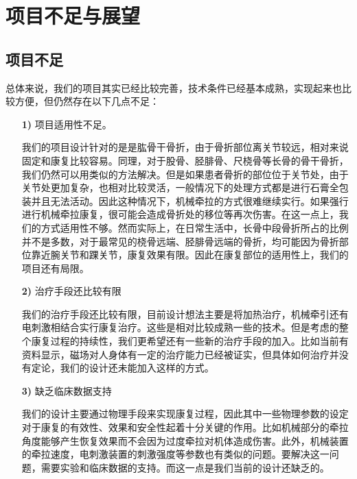 \documentclass[UTF8]{ctexart}
\begin{document}
\section{项目不足与展望}
    \subsection{项目不足}
        总体来说，我们的项目其实已经比较完善，技术条件已经基本成熟，实现起来也比较方便，但仍然存在以下几点不足：
        \begin{enumerate}
            \item [\textbf{1)}]项目适用性不足。
            
            我们的项目设计针对的是是肱骨干骨折，由于骨折部位离关节较远，相对来说固定和康复比较容易。同理，对于股骨、胫腓骨、尺桡骨等长骨的骨干骨折，我们仍然可以用类似的方法解决。但是如果患者骨折的部位位于关节处，由于关节处更加复杂，也相对比较灵活，一般情况下的处理方式都是进行石膏全包装并且无法活动。因此这种情况下，机械牵拉的方式很难继续实行。如果强行进行机械牵拉康复，很可能会造成骨折处的移位等再次伤害。在这一点上，我们的方式适用性不够。然而实际上，在日常生活中，长骨中段骨折所占的比例并不是多数，对于最常见的桡骨远端、胫腓骨远端的骨折，均可能因为骨折部位靠近腕关节和踝关节，康复效果有限。因此在康复部位的适用性上，我们的项目还有局限。

            \item [\textbf{2)}]治疗手段还比较有限
            
            我们的治疗手段还比较有限，目前设计想法主要是将加热治疗，机械牵引还有电刺激相结合实行康复治疗。这些是相对比较成熟一些的技术。但是考虑的整个康复过程的持续性，我们更希望还有一些新的治疗手段的加入。比如当前有资料显示，磁场对人身体有一定的治疗能力已经被证实，但具体如何治疗并没有定论，我们的设计还未能加入这样的方式。

            \item [\textbf{3)}]缺乏临床数据支持
            
            我们的设计主要通过物理手段来实现康复过程，因此其中一些物理参数的设定对于康复的有效性、效果和安全性起着十分关键的作用。比如机械部分的牵拉角度能够产生恢复效果而不会因为过度牵拉对机体造成伤害。此外，机械装置的牵拉速度，电刺激装置的刺激强度等参数也有类似的问题。要解决这一问题，需要实验和临床数据的支持。而这一点是我们当前的设计还缺乏的。
        \end{enumerate}
\end{document}
